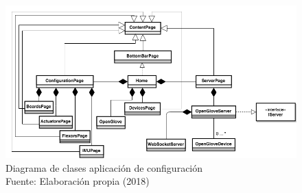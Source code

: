 \begin{figure}[H]
  \begin{center} 
   	\includegraphics[width=1.0\textwidth]{images/chapter04/OpenGlove-Architecture-Configuration-App.png} 
    \caption[Diagrama de clases aplicación de configuración]{Diagrama de clases aplicación de configuración \\Fuente: Elaboración propia (2018)}
    \label{fig:class-diagram-configuarion-app}
  \end{center}
\end{figure}



